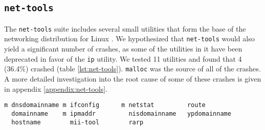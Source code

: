\subsection{\texttt{net-tools}}
The \texttt{net-tools} suite includes several small utilities that form the base of the networking distribution for Linux \cite{nettools}. We hypothesized that \texttt{net-tools} would also yield a significant number of crashes, as some of the utilities in it have been deprecated in favor of the \texttt{ip} utility. We tested 11 utilities and found that 4 (36.4\%) crashed (table \ref{lst:net-tools}). \texttt{malloc} was the source of all of the crashes. A more detailed investigation into the root cause of some of these crashes is given in appendix \ref{appendix:net-tools}.

\PreTable
\begin{lstlisting}[label={lst:net-tools},caption={\texttt{net-tools} utilities tested; those which crashed with \texttt{malloc} are indicated with a \texttt{m} to their left. A total of 4/11 (36.4\%) crashed.}]
m dnsdomainname m ifconfig      m netstat         route
  domainname    m ipmaddr         nisdomainname   ypdomainname
  hostname        mii-tool        rarp
\end{lstlisting}
\PostTable